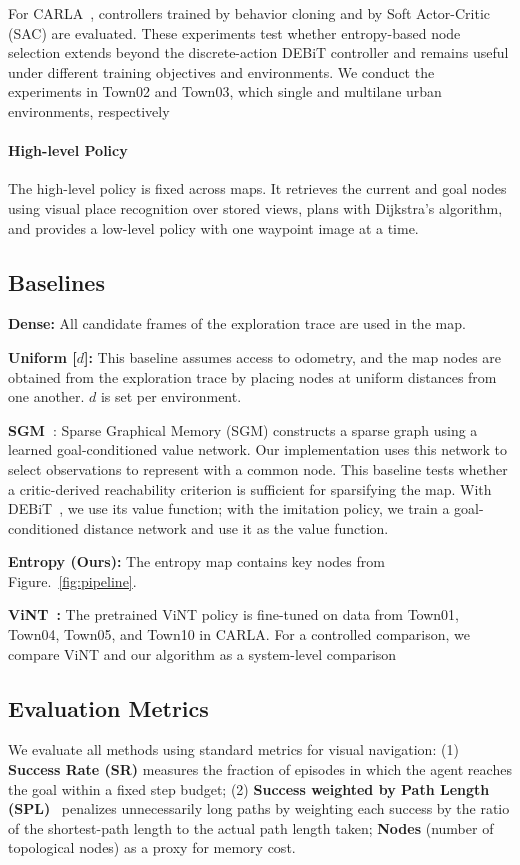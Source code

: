For CARLA~\cite{dosovitskiy2017carla}, controllers trained by
behavior cloning and by
Soft Actor-Critic (SAC) are evaluated. These experiments test
whether entropy-based node selection extends beyond
the discrete-action DEBiT controller and remains
useful under different training objectives and environments.
We conduct the experiments in Town02 and Town03, which single and multilane urban environments, respectively

\paragraph{High-level Policy}
The high-level policy is fixed across maps. It retrieves the
current and goal nodes using  visual place recognition over
stored views, plans with Dijkstra's algorithm, and
provides a low-level policy with one waypoint image at a time.

\subsection{Baselines}
\textbf{Dense:}
All candidate frames of the exploration trace are used in the map.

\textbf{Uniform [$d$]:}
This baseline assumes access to odometry, and the map nodes are obtained from the exploration trace by placing nodes at uniform distances from one another. $d$ is set per environment.

\textbf{SGM~\cite{emmons2020sparse}}:
Sparse Graphical Memory (SGM) constructs a sparse graph using a learned goal-conditioned value network. Our implementation uses this network to select observations to represent with a common node. This baseline tests whether a critic-derived reachability criterion is sufficient for sparsifying the map. With DEBiT~\cite{bono2024end}, we use its value function; with the imitation policy, we train a goal-conditioned distance network and use it as the value function.

\textbf{Entropy (Ours):}
The entropy map contains key nodes from Figure.~\ref{fig:pipeline}.

\textbf{ViNT~\cite{shah2023vint}:}
The pretrained ViNT policy is fine-tuned on data from Town01, Town04, Town05, and Town10 in CARLA.
For a controlled comparison, we compare ViNT and our algorithm as a system-level comparison


\subsection{Evaluation Metrics}
We evaluate all methods using standard metrics for visual navigation: (1) \textbf{Success Rate (SR)} measures the fraction of episodes in which the agent reaches the goal within a fixed step budget; (2) \textbf{Success weighted by Path Length (SPL)}~\cite{anderson2018evaluation} penalizes unnecessarily long paths by weighting each success by the ratio of the shortest-path length to the actual path length taken; \textbf{Nodes} (number of topological nodes) as a
proxy for memory cost.

